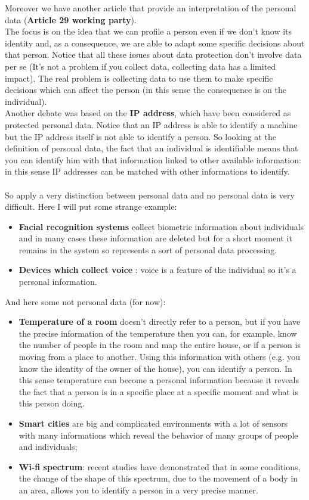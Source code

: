 Moreover we have another article that provide an interpretation of the personal data (\textbf{Article 29 working party}).\\
The focus is on the idea that we can profile a person even if we don’t know its identity and, as a consequence, we are able to adapt some specific decisions about that person. Notice that all these issues about data protection don’t involve data per se (It’s not a problem if you collect data, collecting data has a limited impact). The real problem is collecting data to use them to make specific decisions which can affect the person (in this sense the consequence is on the individual).\\
Another debate was based on the \textbf{IP address}, which have been considered as protected personal data. Notice that an IP address is able to identify a machine but the IP address itself is not able to
identify a person. So looking at the definition of personal data, the fact that an individual is identifiable means that you can identify him with that information linked to other available information: in this sense IP addresses can be matched with other informations to identify.\\ \\
So apply a very distinction between personal data and no personal data is very difficult. Here I will put some strange example:
\begin{itemize}
    \item \textbf{Facial recognition systems} collect biometric information about individuals and in many cases these information are deleted but for a short moment it remains in the system so represents a sort of personal data processing.
    \item \textbf{Devices which collect voice} : voice is a feature of the individual so it’s a personal information.
\end{itemize}
And here some not personal data (for now):
\begin{itemize}
    \item \textbf{Temperature of a room} doesn’t directly refer to a person, but if you have the precise information of the temperature then you can, for example, know the number of people in the room and map the entire house, or if a person is moving from a place to another. Using this information with others (e.g. you know the identity of the owner of the house), you can identify a person. In this sense temperature can become a personal information because it reveals the fact that a person is in a specific place at a specific moment and what is this person doing.
    \item \textbf{Smart cities} are big and complicated environments with a lot of sensors with many informations which reveal the behavior of many groups of people and individuals;
    \item \textbf{Wi-fi spectrum}: recent studies have demonstrated that in some conditions, the change of the shape of this spectrum, due to the movement of a body in an area, allows you to identify a person in a very precise manner.
\end{itemize}
